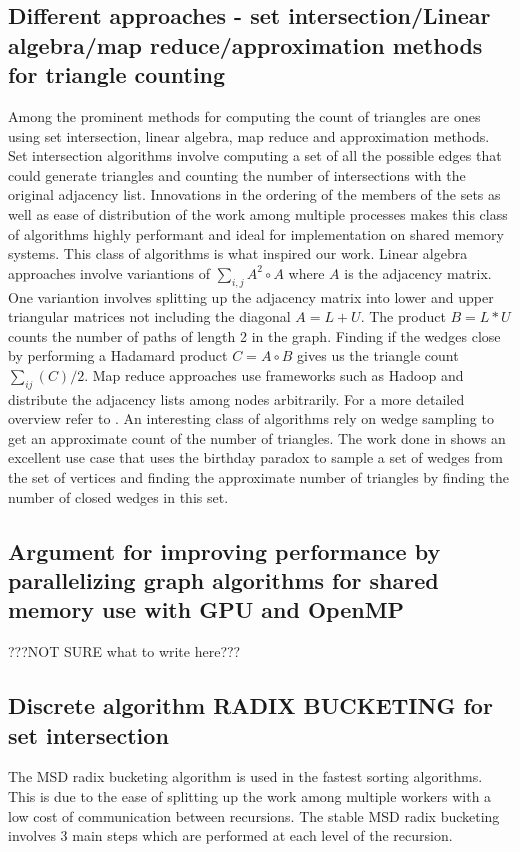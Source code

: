 \documentclass[conference]{IEEEtran}
\begin{document}
\subsection{Different approaches - set intersection/Linear algebra/map reduce/approximation methods for triangle counting}
Among the prominent methods for computing the count of triangles are ones using set intersection, linear algebra, map reduce and approximation methods. Set intersection algorithms \cite{b7} involve computing a set of all the possible edges that could generate triangles and counting the number of intersections with the original adjacency list. Innovations in the ordering of the members of the sets as well as ease of distribution of the work among multiple processes makes this class of algorithms highly performant\cite{b8} and ideal for implementation on shared memory systems. This class of algorithms is what inspired our work. Linear algebra approaches involve variantions of $\sum_{i,j}A^2\circ A$ where $A$ is the adjacency matrix\cite{b6}. One variantion involves splitting up the adjacency matrix into lower and upper triangular matrices not including the diagonal $A = L + U$. The product $B = L*U$ counts the number of paths of length 2 in the graph. Finding if the wedges close by performing a Hadamard product $C= A\circ B$ gives us the triangle count $\sum_{ij}(C)/2$\cite{b10, b9}. Map reduce approaches use frameworks such as Hadoop and distribute the adjacency lists among nodes arbitrarily. For a more detailed overview refer to \cite{b11,b12}. An interesting class of algorithms rely on wedge sampling to get an approximate count of the number of triangles. The work done in \cite{b13} shows an excellent use case that uses the birthday paradox to sample a set of wedges from the set of vertices and finding the approximate number of triangles by finding the number of closed wedges in this set.

\subsection{Argument for improving performance by parallelizing graph algorithms for shared memory use with GPU and OpenMP}
???NOT SURE what to write here???

\subsection{Discrete algorithm RADIX BUCKETING for set intersection}
The MSD radix bucketing algorithm is used in the fastest sorting algorithms\cite{b14}. This is due to the ease of splitting up the work among multiple workers with a low cost of communication between recursions. The stable MSD radix bucketing involves 3 main steps which are performed at each level of the recursion. 
\end{document}
